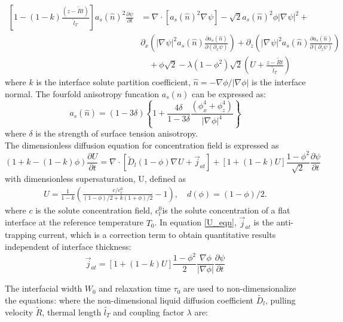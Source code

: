 \documentclass[a4paper,12pt]{article}
\renewcommand{\div}[1]{\nabla_{#1} \cdot}
\newcommand{\grad}[1]{\nabla_{#1}}
\begin{document}
\begin{align}
 \left[1-(1-k) \frac{(z- \tilde{R} t)}{ \tilde{l}_T} \right] a_s(\hat{n})^2 \frac{\partial \psi}{\partial t} &= 
  \div{} [a_s(\hat{n})^2 \grad{} \psi] - \sqrt{2}a_s(\hat{n})^2\phi|\grad{} \psi|^2 + \nonumber  \\  
 & \partial_x \left( |\grad{} \psi|^2 a_s(\hat{n}) \frac{\partial a_s(\hat{n})}{\partial (\partial_x \psi)}  \right)  + 
\partial_z \left( |\grad{} \psi|^2 a_s(\hat{n}) \frac{\partial a_s(\hat{n})}{\partial (\partial_z \psi)}  \right)   \nonumber \\
& \quad + \phi \sqrt{2} - \lambda (1-\phi^2)\sqrt{2} \left(U + \frac{z-\tilde{R} t}{ \tilde{l}_T} \right) 
\end{align}
where $k$ is the interface solute partition coefficient, $\hat{n} = - {\nabla \phi}/{|\nabla \phi|}$ is the interface normal. The fourfold anisotropy funcation $a_{s}(\hat{n})$ can be expressed as:
\begin{equation}
a_{s}(\hat{n}) = (1-3\delta)\left\{1+\frac{4 \delta}{1-3\delta}  \frac{(\phi_{{x}}^4 +\phi_{{z}}^4 )}{| {\grad{}} \phi|^4}  \right\} 
\end{equation}
where $\delta$ is the strength of surface tension anisotropy.\\
The dimensionless diffusion equation for concentration field is expressed as
\begin{equation}
\left(1+k-(1-k)\phi \right) \frac{\partial U}{\partial t} = \div{} [\tilde{D}_l (1-\phi) \grad{} U + \vec{j}_{at}] + [1+(1-k)U]\frac{1-\phi^{2}}{\sqrt{2}}  \frac{\partial \psi}{\partial t}\label{U_eqn}
\end{equation}
with dimensionless supersaturation, U, defined as
\begin{align}
U = \frac{1}{1-k} \left( \frac{ c/c_l^0}{(1-\phi)/2 + k(1+\phi)/2} -1\right), \quad d(\phi) = (1-\phi)/2 .
\end{align}
where $c$ is the solute concentration field, $c_l^0$is the solute concentration of a flat interface at the reference temperature $T_0$. In equation \eqref{U_eqn}, $ \vec{j}_{at}$ is the anti-trapping current, which is a correction term to obtain quantitative results independent of interface thickness:
\begin{equation}
\vec{j}_{at} =  [1+(1-k)U]\frac{1-\phi^{2}}{{2}}  \frac{\nabla \phi}{|\nabla \phi|} \frac{\partial \psi}{\partial t} 
\end{equation}
 
The interfacial width $W_0$ and relaxation time $\tau_0$ are used to non-dimensionalize the equations:
where the non-dimensional liquid diffusion coefficient $\tilde{D_l}$, pulling velocity $\tilde{R}$, thermal length $\tilde{l_T}$ and coupling factor $\lambda$ are:
\end{document}

